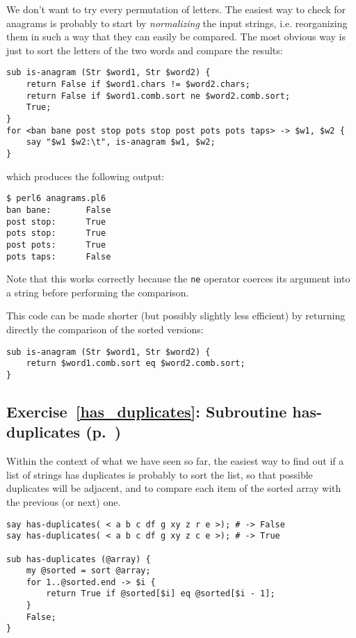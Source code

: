 We don't want to try every permutation of letters. The 
easiest way to check for anagrams is probably to start 
by \emph{normalizing} the input strings, i.e. 
reorganizing them in such a way that they can easily 
be compared. The most obvious way is just to sort the 
letters of the two words and compare the results:

\begin{verbatim}
sub is-anagram (Str $word1, Str $word2) {
    return False if $word1.chars != $word2.chars;
    return False if $word1.comb.sort ne $word2.comb.sort;
    True;
}
for <ban bane post stop pots stop post pots pots taps> -> $w1, $w2 {
    say "$w1 $w2:\t", is-anagram $w1, $w2;
}
\end{verbatim}

which produces the following output:
\begin{verbatim}
$ perl6 anagrams.pl6
ban bane:       False
post stop:      True
pots stop:      True
post pots:      True
pots taps:      False
\end{verbatim}

Note that this works correctly because the {\tt ne} 
operator coerces its argument into a string before 
performing the comparison.

This code can be made shorter (but possibly slightly less 
efficient) by returning directly the comparison of 
the sorted versions:

\begin{verbatim}
sub is-anagram (Str $word1, Str $word2) {
    return $word1.comb.sort eq $word2.comb.sort;
}
\end{verbatim}


\subsection{Exercise~\ref{has_duplicates}: Subroutine has-duplicates (p.~\pageref{has_duplicates})}
\label{sol_has_duplicates}

Within the context of what we have seen so far, the 
easiest way to find out if a list of strings has 
duplicates is probably to sort the list, so that 
possible duplicates will be adjacent, and to 
compare each item of the sorted array with the 
previous (or next) one.

\begin{verbatim}
say has-duplicates( < a b c df g xy z r e >); # -> False
say has-duplicates( < a b c df g xy z c e >); # -> True

sub has-duplicates (@array) {
    my @sorted = sort @array;
    for 1..@sorted.end -> $i {
        return True if @sorted[$i] eq @sorted[$i - 1];
    }
    False;
}
\end{verbatim}
%

